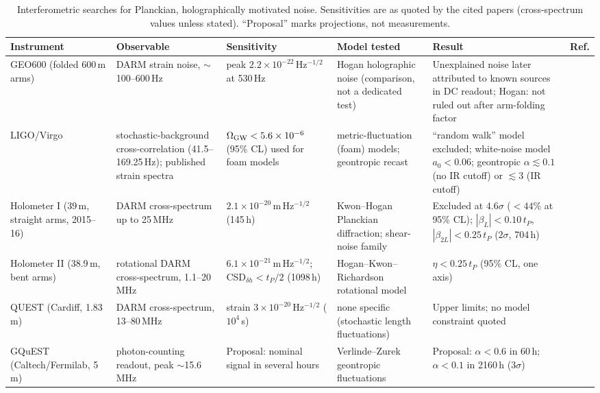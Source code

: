 \begin{table}[t]
\centering
\footnotesize
\caption{Interferometric searches for Planckian, holographically motivated noise.
Sensitivities are as quoted by the cited papers (cross-spectrum values unless
stated). ``Proposal'' marks projections, not measurements.}
\label{tab:holographic-experiments}
\footnotesize\setlength{\tabcolsep}{3pt}
\begin{tabular}{p{2.1cm}p{2.5cm}p{2.9cm}p{2.7cm}p{3.6cm}p{1.6cm}}
\hline
Instrument & Observable & Sensitivity & Model tested & Result & Ref.\\
\hline
GEO600 (folded 600\,m arms) & DARM strain noise, $\sim$100--600\,Hz & peak $2.2\times10^{-22}$\,Hz$^{-1/2}$ at 530\,Hz & Hogan holographic noise (comparison, not a dedicated test) & Unexplained noise later attributed to known sources in DC readout; Hogan: not ruled out after arm-folding factor & \cite{Hogan2008measurement,Luck2010upgrade,Hogan2012interferometers}\\
LIGO/Virgo & stochastic-background cross-correlation (41.5--169.25\,Hz); published strain spectra & $\Omega_{\rm GW}<5.6\times10^{-6}$ (95\% CL) used for foam models & metric-fluctuation (foam) models; geontropic recast & ``random walk'' model excluded; white-noise model $a_0<0.06$; geontropic $\alpha\lesssim0.1$ (no IR cutoff) or $\lesssim3$ (IR cutoff) & \cite{Kwon2016interferometric,Li2023interferometer}\\
Holometer I (39\,m, straight arms, 2015--16) & DARM cross-spectrum up to 25\,MHz & $2.1\times10^{-20}$\,m\,Hz$^{-1/2}$ (145\,h) & Kwon--Hogan Planckian diffraction; shear-noise family & Excluded at $4.6\sigma$ ($<44\%$ at 95\% CL); $|\beta_L|<0.10\,t_P$, $|\beta_{2L}|<0.25\,t_P$ ($2\sigma$, 704\,h) & \cite{Chou2016first,Chou2017interferometric}\\
Holometer II (38.9\,m, bent arms) & rotational DARM cross-spectrum, 1.1--20\,MHz & $6.1\times10^{-21}$\,m\,Hz$^{-1/2}$; CSD$_{\delta h}<t_P/2$ (1098\,h) & Hogan--Kwon--Richardson rotational model & $\eta<0.25\,t_P$ (95\% CL, one axis) & \cite{Richardson2021interferometric}\\
QUEST (Cardiff, 1.83\,m) & DARM cross-spectrum, 13--80\,MHz & strain $3\times10^{-20}$\,Hz$^{-1/2}$ ($10^4$\,s) & none specific (stochastic length fluctuations) & Upper limits; no model constraint quoted & \cite{Patra2025broadband}\\
GQuEST (Caltech/Fermilab, 5\,m) & photon-counting readout, peak $\sim$15.6\,MHz & Proposal: nominal signal in several hours & Verlinde--Zurek geontropic fluctuations & Proposal: $\alpha<0.6$ in 60\,h; $\alpha<0.1$ in 2160\,h ($3\sigma$) & \cite{Vermeulen2025photon}\\
\hline
\end{tabular}
\end{table}

